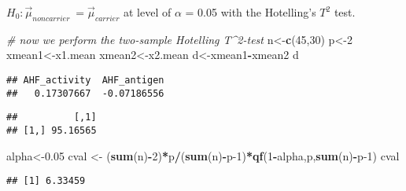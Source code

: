 \documentclass[]{article}
\newenvironment{Shaded}{\begin{snugshade}}{\end{snugshade}}
\newcommand{\CommentTok}[1]{\textcolor[rgb]{0.56,0.35,0.01}{\textit{#1}}}
\newcommand{\DecValTok}[1]{\textcolor[rgb]{0.00,0.00,0.81}{#1}}
\newcommand{\FloatTok}[1]{\textcolor[rgb]{0.00,0.00,0.81}{#1}}
\newcommand{\KeywordTok}[1]{\textcolor[rgb]{0.13,0.29,0.53}{\textbf{#1}}}
\newcommand{\NormalTok}[1]{#1}
\newcommand{\OperatorTok}[1]{\textcolor[rgb]{0.81,0.36,0.00}{\textbf{#1}}}
\newcommand{\StringTok}[1]{\textcolor[rgb]{0.31,0.60,0.02}{#1}}
\begin{document}
\(H_0 : \overrightarrow{\mu}_{noncarrier}\ = \overrightarrow{\mu}_{carrier}\)
at level of \(\alpha\) = 0.05 with the Hotelling's \(T^2\) test.

\begin{Shaded}
\begin{Highlighting}[]
\CommentTok{# now we perform the two-sample Hotelling T^2-test}
\NormalTok{n<-}\KeywordTok{c}\NormalTok{(}\DecValTok{45}\NormalTok{,}\DecValTok{30}\NormalTok{)}
\NormalTok{p<-}\DecValTok{2}
\NormalTok{xmean1<-x1.mean}
\NormalTok{xmean2<-x2.mean}
\NormalTok{d<-xmean1}\OperatorTok{-}\NormalTok{xmean2}
\NormalTok{d}
\end{Highlighting}
\end{Shaded}

\begin{verbatim}
## AHF_activity  AHF_antigen 
##   0.17307667  -0.07186556
\end{verbatim}

\begin{Shaded}
\end{Shaded}

\begin{verbatim}
##          [,1]
## [1,] 95.16565
\end{verbatim}

\begin{Shaded}
\begin{Highlighting}[]
\NormalTok{alpha<-}\FloatTok{0.05}
\NormalTok{cval <-}\StringTok{ }\NormalTok{(}\KeywordTok{sum}\NormalTok{(n)}\OperatorTok{-}\DecValTok{2}\NormalTok{)}\OperatorTok{*}\NormalTok{p}\OperatorTok{/}\NormalTok{(}\KeywordTok{sum}\NormalTok{(n)}\OperatorTok{-}\NormalTok{p}\DecValTok{-1}\NormalTok{)}\OperatorTok{*}\KeywordTok{qf}\NormalTok{(}\DecValTok{1}\OperatorTok{-}\NormalTok{alpha,p,}\KeywordTok{sum}\NormalTok{(n)}\OperatorTok{-}\NormalTok{p}\DecValTok{-1}\NormalTok{)}
\NormalTok{cval}
\end{Highlighting}
\end{Shaded}

\begin{verbatim}
## [1] 6.33459
\end{verbatim}
\end{document}
